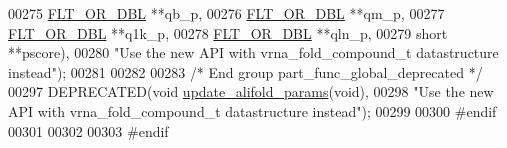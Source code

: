 \begin{DoxyCode}
00275                      \hyperlink{group__data__structures_ga31125aeace516926bf7f251f759b6126}{FLT\_OR\_DBL} **qb\_p,
00276                      \hyperlink{group__data__structures_ga31125aeace516926bf7f251f759b6126}{FLT\_OR\_DBL} **qm\_p,
00277                      \hyperlink{group__data__structures_ga31125aeace516926bf7f251f759b6126}{FLT\_OR\_DBL} **q1k\_p,
00278                      \hyperlink{group__data__structures_ga31125aeace516926bf7f251f759b6126}{FLT\_OR\_DBL} **qln\_p,
00279                      \textcolor{keywordtype}{short} **pscore),
00280           \textcolor{stringliteral}{"Use the new API with vrna\_fold\_compound\_t datastructure instead"});
00281 
00282 
00283 \textcolor{comment}{/* End group part\_func\_global\_deprecated */}
00297 DEPRECATED(\textcolor{keywordtype}{void} \hyperlink{alifold_8h_ac484c6bd429bafbd353b91044508d8e9}{update\_alifold\_params}(\textcolor{keywordtype}{void}),
00298           \textcolor{stringliteral}{"Use the new API with vrna\_fold\_compound\_t datastructure instead"});
00299 
00300 \textcolor{preprocessor}{#endif}
00301 
00302 
00303 \textcolor{preprocessor}{#endif}
\end{DoxyCode}
